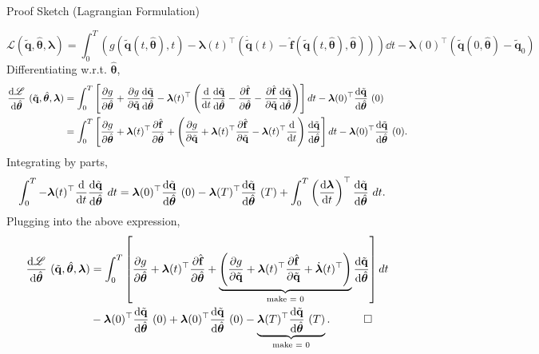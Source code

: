 \begin{frame}{Proof Sketch (Lagrangian Formulation)}
\vspace{-0.2cm}
{\scriptsize
$$\mathscr{L}(\tilde{\mathbf{q}},\hat{\bm{\theta}},\bm{\lambda}) = \int_0^T \left( g(\tilde{\mathbf{q}}(t,\hat{\bm{\theta}}),t) - \bm{\lambda}(t)^{\top}\left( \dot{\tilde{\mathbf{q}}}(t) - \hat{\mathbf{f}}(\tilde{\mathbf{q}}(t,\hat{\bm{\theta}}),\hat{\bm{\theta}})  \right) \right)\dd t-\bm{\lambda}(0)^{\top}(\tilde{\mathbf{q}}(0,\hat{\bm{\theta}})-\tilde{\mathbf{q}}_0)$$
Differentiating w.r.t. $\hat{\bm{\theta}}$,
\begin{align*}
    \dv{\mathscr{L}}{\hat{\bm{\theta}}}~(\tilde{\mathbf{q}},\hat{\bm{\theta}},\bm{\lambda}) &= \int_0^T\left[ \pdv{g}{\hat{\bm{\theta}}} + \pdv{g}{\tilde{\mathbf{q}}} \dv{\tilde{\mathbf{q}}}{\hat{\bm{\theta}}} - \bm{\lambda}(t)^{\top} \left( \dv{t}\dv{\tilde{\mathbf{q}}}{\hat{\bm{\theta}}} - \pdv{\hat{\mathbf{f}}}{\hat{\bm{\theta}}} - \pdv{\hat{\mathbf{f}}}{\tilde{\mathbf{q}}}\dv{\tilde{\mathbf{q}}}{\hat{\bm{\theta}}} \right) \right] dt - \bm{\lambda}(0)^{\top}\dv{\tilde{\mathbf{q}}}{\hat{\bm{\theta}}}~(0)\notag\\
    &= \int_0^T \left[\pdv{g}{\hat{\bm{\theta}}} + \bm{\lambda}(t)^{\top} \pdv{\hat{\mathbf{f}}}{\hat{\bm{\theta}}}+ \left( \pdv{g}{\tilde{\mathbf{q}}} + \bm{\lambda}(t)^{\top}\pdv{\hat{\mathbf{f}}}{\tilde{\mathbf{q}}}-\bm{\lambda}(t)^{\top}\dv{t} \right)\dv{\tilde{\mathbf{q}}}{\hat{\bm{\theta}}} \right]dt- \bm{\lambda}(0)^{\top}\dv{\tilde{\mathbf{q}}}{\hat{\bm{\theta}}}~(0). 
\end{align*}
Integrating by parts,
\begin{align*}
    \int_0^T -\bm{\lambda}(t)^{\top}\dv{t}\dv{\tilde{\mathbf{q}}}{\hat{\bm{\theta}}}~dt &= \bm{\lambda}(0)^{\top}\dv{\tilde{\mathbf{q}}}{\hat{\bm{\theta}}}~(0) - \bm{\lambda}(T)^{\top}\dv{\tilde{\mathbf{q}}}{\hat{\bm{\theta}}}~(T) + \int_0^T \left( \dv{\bm{\lambda}}{t}\right)^{\top}\dv{\tilde{\mathbf{q}}}{\hat{\bm{\theta}}}~dt.
\end{align*}
Plugging into the above expression,
\begin{align*}
   \dv{\mathscr{L}}{\hat{\bm{\theta}}}~(\tilde{\mathbf{q}},\hat{\bm{\theta}},\bm{\lambda}) &= \int_0^T\left[ \pdv{g}{\hat{\bm{\theta}}} + \bm{\lambda}(t)^{\top} \pdv{\hat{\textbf{f}}}{\hat{\bm{\theta}}} + \underbrace{\left( \pdv{g}{\tilde{\mathbf{q}}} + \bm{\lambda}(t)^{\top}\pdv{\hat{\mathbf{f}}}{\tilde{\mathbf{q}}}+ \dot{\bm{\lambda}}(t)^{\top}\right)}_{\text{make = 0}} \dv{\tilde{\mathbf{q}}}{\hat{\bm{\theta}}} \right]dt \\
   & - \bm{\lambda}(0)^{\top}\dv{\tilde{\mathbf{q}}}{\hat{\bm{\theta}}}~(0)+\bm{\lambda}(0)^{\top}\dv{\tilde{\mathbf{q}}}{\hat{\bm{\theta}}}~(0) - \underbrace{\bm{\lambda}(T)^{\top}\dv{\tilde{\mathbf{q}}}{\hat{\bm{\theta}}}~(T)}_{\text{make = 0}}.\quad\qed
\end{align*}

}

\end{frame}



